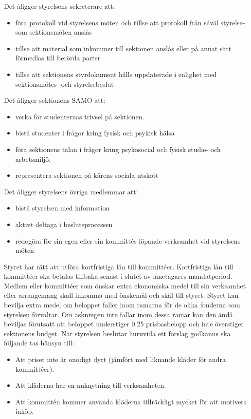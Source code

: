 \documentclass[a4paper]{dteklag}
\newcommand{\prisbasbelopp}[1]{
    #1 prisbasbelopp
    \ifdef{\nuvarandeprisbasbelopp}{
        \marginpar{
            \small{ \textbf{\roundandprint{\xintiexpr#1 * \nuvarandeprisbasbelopp\relax}kr}}
        }
    }{}
}
\begin{document}
\para Det åligger styrelsens sekreterare att:
\begin{itemize}
  \item föra protokoll vid styrelsens möten och tillse att protokoll från såväl styrelse- som sektionsmöten anslås
  \item tillse att material som inkommer till sektionen anslås eller på annat sätt förmedlas till berörda parter
  \item tillse att sektionens styrdokument hålls uppdaterade i enlighet med sektionsmötes- och styrelsebeslut
\end{itemize}
\para Det åligger sektionens SAMO att:
\begin{itemize}
  \item verka för studenternas trivsel på sektionen.
  \item bistå studenter i frågor kring fysisk och psykisk hälsa
  \item föra sektionens talan i frågor kring psykosocial och fysisk studie- och arbetsmiljö.
  \item representera sektionen på kårens sociala utskott
\end{itemize}
\para Det åligger styrelsens övriga medlemmar att:
\begin{itemize}
  \item bistå styrelsen med information
  \item aktivt deltaga i beslutsprocessen
  \item redogöra för sin egen eller sin kommittés löpande verksamhet vid styrelsens möten
\end{itemize}
\para [Ekonomi] Styret har rätt att utföra kortfristiga lån till kommittéer.
\para Kortfristiga lån till kommittéer ska betalas tillbaka senast i slutet av lånetagares mandatperiod.
\para Medlem eller kommittéer som önskar extra ekonomiska medel till sin verksamhet eller arrangemang skall inkomma med önskemål och skäl till styret.
\stycke Styret kan bevilja extra medel om beloppet faller inom ramarna för de olika fonderna som styrelsen förvaltar.
\stycke Om äskningen inte fallar inom dessa ramar kan den ändå beviljas förutsatt att beloppet understiger \prisbasbelopp{0.25} och inte överstiger sektionens budget.
\para När styrelsen beslutar huruvida ett förslag godkänns ska följande tas hänsyn till:
\begin{itemize}
    \item Att priset inte är onödigt dyrt (jämfört med liknande kläder för andra kommittéer).
    \item Att kläderna har en anknytning till verksamheten.
    \item Att kommittén kommer använda kläderna tillräckligt mycket för att motivera inköp.
\end{itemize}
\end{document}

